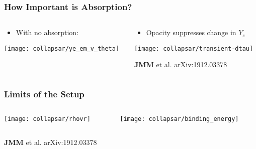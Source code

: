 \documentclass[]{beamer}
\newcommand{\backupbegin}{
   \newcounter{finalframe}
   \setcounter{finalframe}{\value{framenumber}}
}
\begin{document}
\begin{frame}
  \frametitle{How Important is Absorption?}
  \begin{columns}
    \begin{column}{6cm}
      \begin{itemize}
      \item With no absorption:
      \end{itemize}
      \begin{center}
        \texttt{[image: collapsar/ye\_em\_v\_theta]}
      \end{center}
    \end{column}
    \begin{column}{6cm}
      \begin{itemize}
      \item Opacity suppresses change in $Y_e$
      \end{itemize}
      \begin{center}
        \texttt{[image: collapsar/transient-dtau]}
      \end{center}
      \begin{tiny}
        \textbf{JMM} et al. arXiv:1912.03378
      \end{tiny}
    \end{column}
  \end{columns}
\end{frame}

\begin{frame}
  \frametitle{Limits of the Setup}
  \begin{columns}
    \begin{column}{6cm}
      \begin{center}
        \texttt{[image: collapsar/rhovr]}
      \end{center}
    \end{column}
    \begin{column}{6cm}
      \begin{center}
        \texttt{[image: collapsar/binding\_energy]}
      \end{center}
    \end{column}
  \end{columns}
  \begin{tiny}
    \textbf{JMM} et al. arXiv:1912.03378
  \end{tiny}
\end{frame}

\backupbegin
\end{document}
